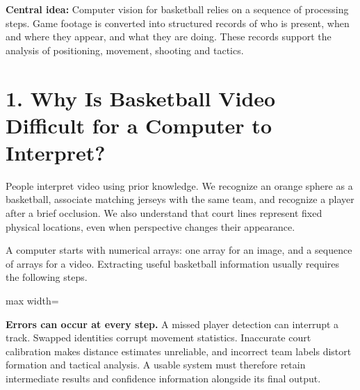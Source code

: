 \documentclass[11pt,a4paper,oneside]{report}
\begin{document}
\begin{heroBox}
\textbf{Central idea:}\quad
Computer vision for basketball relies on a sequence of processing steps. Game footage is converted into structured records of who is present, when and where they appear, and what they are doing. These records support the analysis of positioning, movement, shooting and tactics.
\end{heroBox}

\section*{1. Why Is Basketball Video Difficult for a Computer to Interpret?}

People interpret video using prior knowledge. We recognize an orange sphere as a basketball, associate matching jerseys with the same team, and recognize a player after a brief occlusion. We also understand that court lines represent fixed physical locations, even when perspective changes their appearance.

A computer starts with numerical arrays: one array for an image, and a sequence of arrays for a video. Extracting useful basketball information usually requires the following steps.

\begin{center}
\begin{adjustbox}{max width=\linewidth}
\end{adjustbox}
\end{center}

\begin{plainBox}
\textbf{Errors can occur at every step.}\quad
A missed player detection can interrupt a track. Swapped identities corrupt movement statistics. Inaccurate court calibration makes distance estimates unreliable, and incorrect team labels distort formation and tactical analysis. A usable system must therefore retain intermediate results and confidence information alongside its final output.
\end{plainBox}
\end{document}
